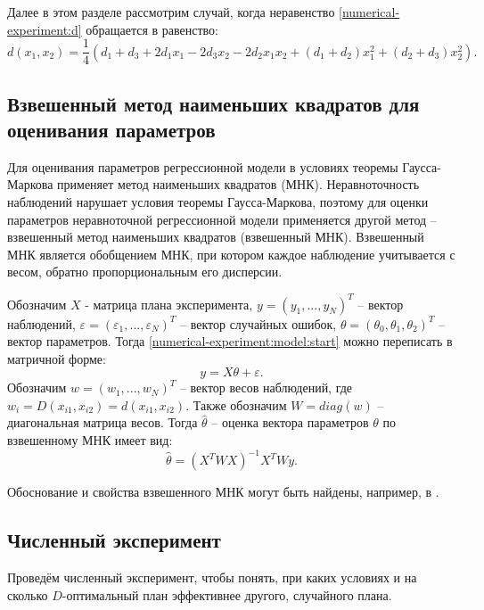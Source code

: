 Далее в этом разделе рассмотрим случай, когда неравенство \ref{numerical-experiment:d} обращается в равенство:
\begin{equation}\label{numerical-experiment:d}
d(x_1, x_2) = \frac 1 4 (d_1 + d_3 + 2 d_1 x_1 - 2 d_3 x_2 - 2d_2 x_1 x_2 + (d_1 + d_2)x_1^2 + (d_2 + d_3)x_2^2).
\end{equation}

\subsection {Взвешенный метод наименьших квадратов для оценивания параметров}
Для оценивания параметров регрессионной модели в условиях теоремы Гаусса-Маркова применяет метод наименьших квадратов (МНК). Неравноточность наблюдений нарушает условия теоремы Гаусса-Маркова, поэтому для оценки параметров неравноточной регрессионной модели применяется другой метод -- взвешенный метод наименьших квадратов (взвешенный МНК). Взвешенный МНК является обобщением МНК, при котором каждое наблюдение учитывается с весом, обратно пропорциональным его дисперсии. 

Обозначим $X$ - матрица плана эксперимента, $y = (y_1, ..., y_N)^T$ -- вектор наблюдений, $\varepsilon = (\varepsilon_1, ..., \varepsilon_N)^T$ -- вектор случайных ошибок, $\theta = (\theta_0, \theta_1, \theta_2)^T$ -- вектор параметров. Тогда \eqref{numerical-experiment:model:start} можно переписать в матричной форме:
\begin{equation}
y = X\theta + \varepsilon.
\end{equation}
Обозначим $w = (w_1, ..., w_N)^T$ -- вектор весов наблюдений, где $w_i = D(x_{i1}, x_{i2}) = d(x_{i1}, x_{i2})$. Также обозначим $W = diag(w)$ -- диагональная матрица весов.
Тогда $\hat \theta$ -- оценка вектора параметров $\theta$ по взвешенному МНК имеет вид:
\begin{equation}
\hat \theta = (X^T W X)^{-1} X^T W y.
\end{equation}

Обоснование и свойства взвешенного МНК могут быть найдены, например, в \cite{aivazian}.

\subsection{Численный эксперимент}
Проведём численный эксперимент, чтобы понять, при каких условиях и на сколько $D$-оптимальный план эффективнее другого, случайного плана.
